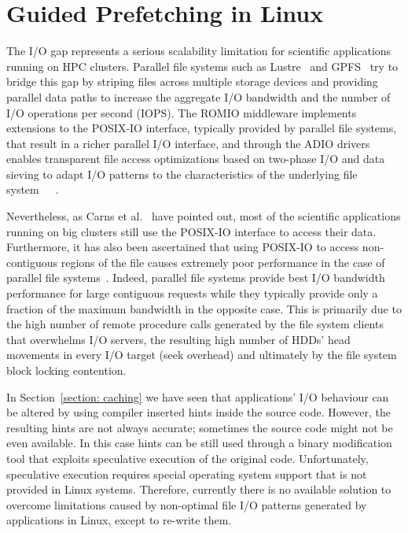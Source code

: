 \chapter{Guided Prefetching in Linux} \label{chapt: prefetching}
The I/O gap represents a serious scalability limitation for scientific applications running on HPC clusters. Parallel file systems such as Lustre~\cite{Braam02} and GPFS~\cite{SchmuckH02} try to bridge this gap by striping files 
across multiple storage devices and providing parallel data paths to increase the aggregate I/O bandwidth and the number of I/O operations per second (IOPS). The ROMIO middleware implements extensions to the POSIX-IO interface, typically 
provided by parallel file systems, that result in a richer parallel I/O interface, and through the ADIO drivers enables transparent file access optimizations based on two-phase I/O and data sieving to adapt I/O patterns to the characteristics 
of the underlying file system~\cite{ThakurGL99}~\cite{Ying08}~\cite{ProstTHKW00}.

Nevertheless, as Carns et al.~\cite{CarnsHABLLR11} have pointed out, most of the scientific applications running on big clusters still use the POSIX-IO interface to access their data. Furthermore, it has also been ascertained that 
using POSIX-IO to access non-contiguous regions of the file causes extremely poor performance in the case of parallel file systems~\cite{ChingCLP06}. Indeed, parallel file systems provide best I/O bandwidth performance for large 
contiguous requests while they typically provide only a fraction of the maximum bandwidth in the opposite case. This is primarily due to the high number of remote procedure calls generated by the file system clients that overwhelms 
I/O servers, the resulting high number of HDDs' head movements in every I/O target (seek overhead) and ultimately by the file system block locking contention.

In Section~\ref{section: caching} we have seen that applications' I/O behaviour can be altered by using compiler inserted hints inside the source code. However, the resulting hints are not always accurate; sometimes the source code 
might not be even available. In this case hints can be still used through a binary modification tool that exploits speculative execution of the original code. Unfortunately, speculative execution requires special operating system 
support that is not provided in Linux systems. Therefore, currently there is no available solution to overcome limitations caused by non-optimal file I/O patterns generated by applications in Linux, except to re-write them.

